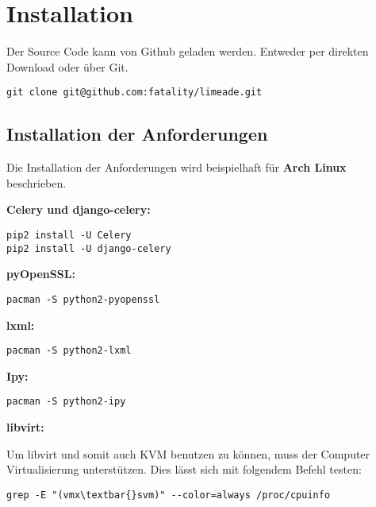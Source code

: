 \documentclass[letterpaper,10pt,english]{sphinxmanual}
\begin{document}
\section{Installation}
\label{getting-started/install:django-uni-form}\label{getting-started/install:installation}\label{getting-started/install::doc}
Der Source Code kann von Github geladen werden. Entweder per direkten Download
oder über Git.

\begin{Verbatim}[commandchars=\\\{\}]
git clone git@github.com:fatality/limeade.git
\end{Verbatim}


\subsection{Installation der Anforderungen}
\label{getting-started/install:installation-der-anforderungen}
Die Installation der Anforderungen wird beispielhaft für \textbf{Arch Linux}
beschrieben.

\textbf{Celery und django-celery:}

\begin{Verbatim}[commandchars=\\\{\}]
pip2 install -U Celery
pip2 install -U django-celery
\end{Verbatim}

\textbf{pyOpenSSL:}

\begin{Verbatim}[commandchars=\\\{\}]
pacman -S python2-pyopenssl
\end{Verbatim}

\textbf{lxml:}

\begin{Verbatim}[commandchars=\\\{\}]
pacman -S python2-lxml
\end{Verbatim}

\textbf{Ipy:}

\begin{Verbatim}[commandchars=\\\{\}]
pacman -S python2-ipy
\end{Verbatim}

\textbf{libvirt:}

Um libvirt und somit auch KVM benutzen zu können, muss der Computer
Virtualisierung unterstützen. Dies lässt sich mit folgendem Befehl testen:
\begin{Verbatim}[commandchars=\\\{\}]
grep -E "(vmx\textbar{}svm)" --color=always /proc/cpuinfo
\end{Verbatim}
\end{document}

